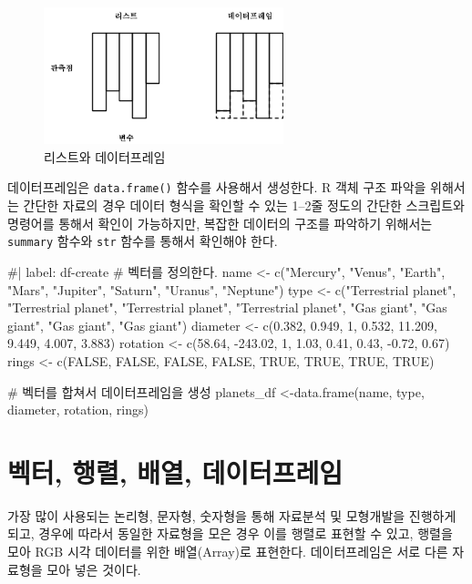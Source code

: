 \documentclass[
  letterpaper,
]{book}
\newenvironment{Shaded}{\begin{snugshade}}{\end{snugshade}}
\newcommand{\NormalTok}[1]{\textcolor[rgb]{0.00,0.23,0.31}{#1}}
\begin{document}
\begin{figure}[H]

{\centering \includegraphics[width=2.73958in,height=\textheight]{images/data-handling-list-dataframe.png}

}

\caption{리스트와 데이터프레임}

\end{figure}%

데이터프레임은 \texttt{data.frame()} 함수를 사용해서 생성한다. R 객체
구조 파악을 위해서는 간단한 자료의 경우 데이터 형식을 확인할 수 있는
1--2줄 정도의 간단한 스크립트와 명령어를 통해서 확인이 가능하지만,
복잡한 데이터의 구조를 파악하기 위해서는 \texttt{summary} 함수와
\texttt{str} 함수를 통해서 확인해야 한다.

\begin{Shaded}
\begin{Highlighting}[]
\NormalTok{\#| label: df{-}create}
\NormalTok{\# 벡터를 정의한다.}
\NormalTok{name \textless{}{-} c("Mercury", "Venus", "Earth", "Mars", "Jupiter", "Saturn", "Uranus", "Neptune")}
\NormalTok{type \textless{}{-} c("Terrestrial planet", "Terrestrial planet", "Terrestrial planet", }
\NormalTok{          "Terrestrial planet", "Gas giant", "Gas giant", "Gas giant", "Gas giant")}
\NormalTok{diameter \textless{}{-} c(0.382, 0.949, 1, 0.532, 11.209, 9.449, 4.007, 3.883)}
\NormalTok{rotation \textless{}{-} c(58.64, {-}243.02, 1, 1.03, 0.41, 0.43, {-}0.72, 0.67)}
\NormalTok{rings \textless{}{-} c(FALSE, FALSE, FALSE, FALSE, TRUE, TRUE, TRUE, TRUE)}

\NormalTok{\# 벡터를 합쳐서 데이터프레임을 생성}
\NormalTok{planets\_df \textless{}{-}data.frame(name, type, diameter, rotation, rings)}
\end{Highlighting}
\end{Shaded}

\section{벡터, 행렬, 배열, 데이터프레임}\label{data-type-vector}

가장 많이 사용되는 논리형, 문자형, 숫자형을 통해 자료분석 및 모형개발을
진행하게 되고, 경우에 따라서 동일한 자료형을 모은 경우 이를 행렬로
표현할 수 있고, 행렬을 모아 RGB 시각 데이터를 위한 배열(Array)로
표현한다. 데이터프레임은 서로 다른 자료형을 모아 넣은 것이다.
  
\end{document}
